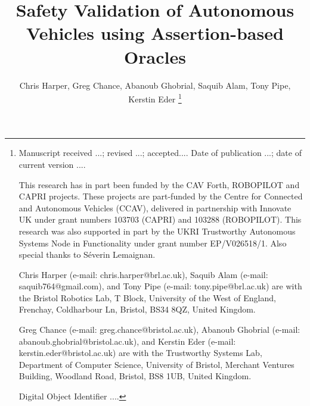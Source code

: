 \documentclass[letterpaper, 10 pt, journal, twoside]{IEEEtran}
\newcommand{\pathToSourceFiles}{../source}
\begin{document}
\title{Safety Validation of Autonomous Vehicles using Assertion-based Oracles}

\author{Chris Harper, Greg Chance, Abanoub Ghobrial, Saquib Alam, Tony Pipe, Kerstin Eder
\thanks{{\footnotesize
Manuscript  
received ...;
revised ...;  
accepted.... 
Date of publication ...;
date of current version ....

This research has in part been funded by the CAV Forth, ROBOPILOT and CAPRI projects. These projects are part-funded by the Centre for Connected and Autonomous Vehicles (CCAV), delivered in partnership with Innovate UK under grant numbers 103703 (CAPRI) and 103288 (ROBOPILOT). This research was also supported in part by the UKRI Trustworthy Autonomous Systems Node in Functionality under grant number EP/V026518/1. Also special thanks to S\'everin Lemaignan.


Chris Harper (e-mail: chris.harper@brl.ac.uk),
Saquib Alam (e-mail: saquib764@gmail.com),
and
Tony Pipe (e-mail: tony.pipe@brl.ac.uk) 
are with the Bristol Robotics Lab, T Block, University of the West of England, Frenchay, Coldharbour Ln, Bristol, BS34 8QZ, United Kingdom. 

Greg Chance (e-mail: greg.chance@bristol.ac.uk), 
Abanoub Ghobrial (e-mail: abanoub.ghobrial@bristol.ac.uk), 
and 
Kerstin Eder (e-mail: kerstin.eder@bristol.ac.uk) 
are with the Trustworthy Systems Lab, Department of Computer Science, University of Bristol, Merchant Ventures Building, Woodland Road, Bristol, BS8 1UB, United Kingdom. 

Digital Object Identifier ....
}}}
%
%
\maketitle

\begin{abstract}
\noindent 

\end{abstract}
\end{document}
